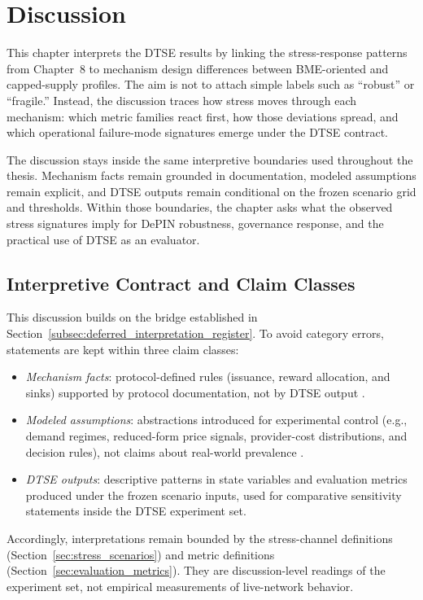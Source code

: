 \section{Discussion}
\label{sec:discussion}
This chapter interprets the DTSE results by linking the stress-response patterns from Chapter~8 to mechanism design differences between BME-oriented and capped-supply profiles. The aim is not to attach simple labels such as ``robust'' or ``fragile.'' Instead, the discussion traces how stress moves through each mechanism: which metric families react first, how those deviations spread, and which operational failure-mode signatures emerge under the DTSE contract.

The discussion stays inside the same interpretive boundaries used throughout the thesis. Mechanism facts remain grounded in documentation, modeled assumptions remain explicit, and DTSE outputs remain conditional on the frozen scenario grid and thresholds. Within those boundaries, the chapter asks what the observed stress signatures imply for DePIN robustness, governance response, and the practical use of DTSE as an evaluator.

\subsection{Interpretive Contract and Claim Classes}
This discussion builds on the bridge established in Section~\ref{subsec:deferred_interpretation_register}. To avoid category errors, statements are kept within three claim classes:
\begin{itemize}
    \item \emph{Mechanism facts}: protocol-defined rules (issuance, reward allocation, and sinks) supported by protocol documentation, not by DTSE output \cite{OnocoyWhitepaper301, OnocoyToken, OnocoyRewards}.
    \item \emph{Modeled assumptions}: abstractions introduced for experimental control (e.g., demand regimes, reduced-form price signals, provider-cost distributions, and decision rules), not claims about real-world prevalence \cite{Morris2019, Braakman2022}.
    \item \emph{DTSE outputs}: descriptive patterns in state variables and evaluation metrics produced under the frozen scenario inputs, used for comparative sensitivity statements inside the DTSE experiment set.
\end{itemize}
Accordingly, interpretations remain bounded by the stress-channel definitions (Section~\ref{sec:stress_scenarios}) and metric definitions (Section~\ref{sec:evaluation_metrics}). They are discussion-level readings of the experiment set, not empirical measurements of live-network behavior.

